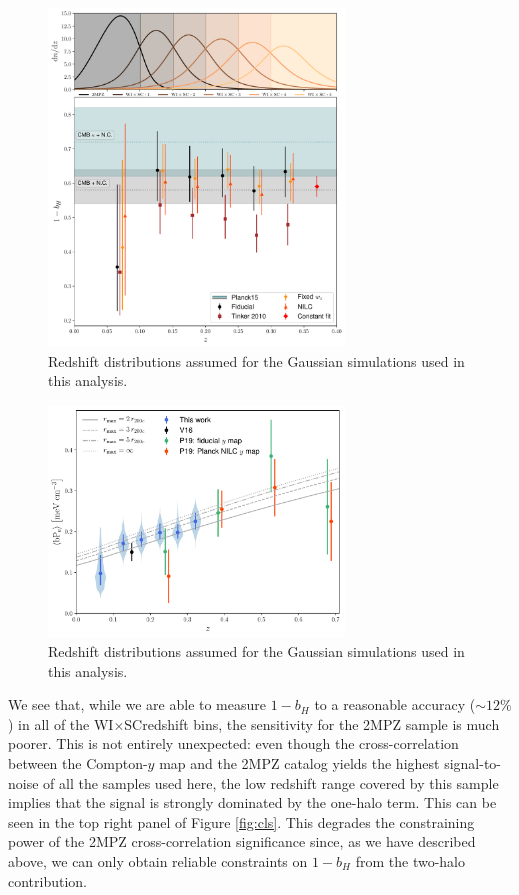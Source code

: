 \documentclass[useAMS,usenatbib]{mn2e}
\newcommand{\wisc}{WI$\times$SC}
\begin{document}
      \begin{figure}
        \centering
        \includegraphics[width=0.7\textwidth]{./figures/bhydro.pdf}
        \caption{Redshift distributions assumed for the Gaussian simulations used in this analysis.}
        \label{fig:bh}
      \end{figure}
      \begin{figure}
        \centering
        \includegraphics[width=0.7\textwidth]{./figures/by.pdf}
        \caption{Redshift distributions assumed for the Gaussian simulations used in this analysis.}
        \label{fig:by}
      \end{figure}
      
      We see that, while we are able to measure $1-b_H$ to a reasonable accuracy ($\sim12\%$) in all of the \wisc redshift bins, the sensitivity for the 2MPZ sample is much poorer. This is not entirely unexpected: even though the cross-correlation between the Compton-$y$ map and the 2MPZ catalog yields the highest signal-to-noise of all the samples used here, the low redshift range covered by this sample implies that the signal is strongly dominated by the one-halo term. This can be seen in the top right panel of Figure \ref{fig:cls}. This degrades the constraining power of the 2MPZ cross-correlation significance since, as we have described above, we can only obtain reliable constraints on $1-b_H$ from the two-halo contribution.
            
\end{document}
